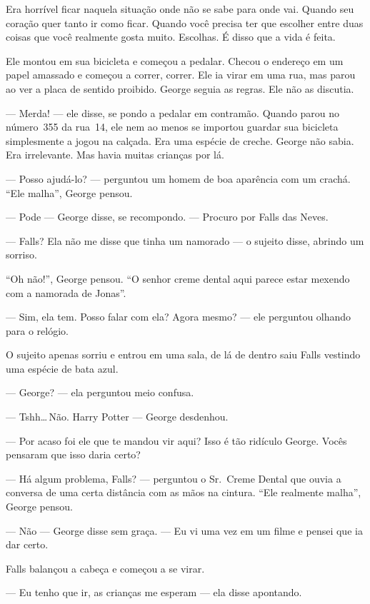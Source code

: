 Era horrível ficar naquela situação onde não se sabe para onde vai. Quando seu coração quer tanto ir como ficar. Quando você precisa ter que escolher entre duas coisas que você realmente gosta muito. Escolhas. É disso que a vida é feita.

Ele montou em sua bicicleta e começou a pedalar. Checou o endereço em um papel amassado e começou a correr, correr. Ele ia virar em uma rua, mas parou ao ver a placa de sentido proibido. George seguia as regras. Ele não as discutia.

--- Merda! --- ele disse, se pondo a pedalar em contramão. Quando parou no número~355 da rua~14, ele nem ao menos se importou  guardar sua bicicleta\mudanca{:} simplesmente a jogou na calçada. Era uma espécie de creche. George não sabia. Era irrelevante. Mas havia muitas crianças por lá.

--- Posso ajudá-lo? --- perguntou um homem de boa aparência com um crachá. ``Ele malha'', George pensou.

--- Pode --- George disse, se recompondo. --- Procuro por Falls das Neves.

--- Falls? Ela não me disse que tinha um namorado --- o sujeito disse, abrindo um sorriso.

``Oh não!'', George pensou. ``O senhor creme dental aqui parece estar mexendo com a namorada de Jonas''.

--- Sim, ela tem. Posso falar com ela? Agora mesmo? --- ele perguntou\mudanca{,} olhando para o relógio.

O sujeito apenas sorriu e entrou em uma sala, de lá de dentro saiu Falls vestindo uma espécie de bata azul.

--- George? --- ela perguntou\mudanca{,} meio confusa.

--- Tshh\ldots\,Não. Harry Potter --- George desdenhou.

--- Por acaso foi ele que te mandou vir aqui? Isso é tão ridículo\mudanca{,} George. Vocês pensaram que isso daria certo?

--- Há algum problema, Falls? --- perguntou o Sr.~Creme Dental\mudanca{,} que ouvia a conversa de uma certa distância com as mãos na cintura. ``Ele realmente malha'', George pensou.

--- Não --- George disse\mudanca{,} sem graça. --- Eu vi uma vez em um filme e pensei que ia dar certo.

Falls balançou a cabeça e começou a se virar.

--- Eu tenho que ir, as crianças me esperam --- ela disse\mudanca{,} apontando.


